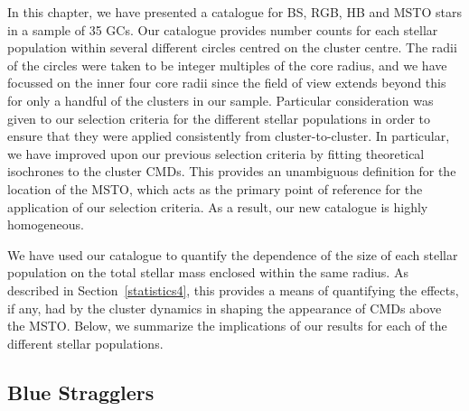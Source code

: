 In this chapter, we have presented a catalogue for BS, RGB,
HB and MSTO stars in a sample of 35 GCs.  Our catalogue provides
number counts for each stellar population within several different
circles centred on the cluster centre.  The radii of the circles were
taken to be integer multiples of the
core radius, and we have focussed on the inner four core radii
since the field of view extends beyond this for only a handful of the
clusters in our sample.  Particular consideration was
given to our selection criteria for the 
different stellar populations in order to ensure that they were
applied consistently from cluster-to-cluster.  In particular, we have
improved upon our previous selection criteria \citep{leigh07} by
fitting theoretical isochrones to the cluster CMDs.  This provides an
unambiguous definition for the location of the MSTO, which acts as the 
primary point of reference for the application of our selection
criteria.  As a result, our new catalogue is highly homogeneous.

We have used our catalogue to quantify the dependence
of the size of each stellar population on the total stellar mass
enclosed within the same radius.  As described in
Section~\ref{statistics4}, this provides a means of quantifying the
effects, if any, had by the cluster dynamics in shaping the appearance 
of CMDs above the MSTO.  Below, we summarize the implications of our
results for each of the different stellar populations.
 
\subsection{Blue Stragglers} \label{BSs4}

